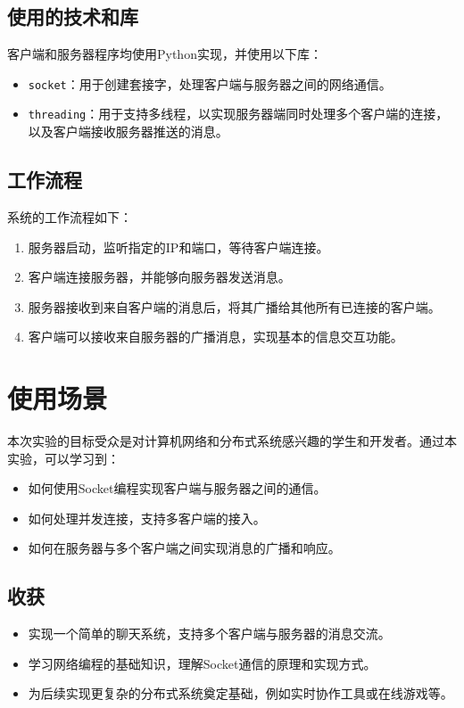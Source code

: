 \documentclass[12pt]{article}
\begin{document}
\subsection{使用的技术和库}
客户端和服务器程序均使用Python实现，并使用以下库：
\begin{itemize}
    \item \texttt{socket}：用于创建套接字，处理客户端与服务器之间的网络通信。
    \item \texttt{threading}：用于支持多线程，以实现服务器端同时处理多个客户端的连接，以及客户端接收服务器推送的消息。
\end{itemize}

\subsection{工作流程}
系统的工作流程如下：
\begin{enumerate}
    \item 服务器启动，监听指定的IP和端口，等待客户端连接。
    \item 客户端连接服务器，并能够向服务器发送消息。
    \item 服务器接收到来自客户端的消息后，将其广播给其他所有已连接的客户端。
    \item 客户端可以接收来自服务器的广播消息，实现基本的信息交互功能。
\end{enumerate}

\section{使用场景}
本次实验的目标受众是对计算机网络和分布式系统感兴趣的学生和开发者。通过本实验，可以学习到：
\begin{itemize}
    \item 如何使用Socket编程实现客户端与服务器之间的通信。
    \item 如何处理并发连接，支持多客户端的接入。
    \item 如何在服务器与多个客户端之间实现消息的广播和响应。
\end{itemize}

\subsection{收获}
\begin{itemize}
    \item 实现一个简单的聊天系统，支持多个客户端与服务器的消息交流。
    \item 学习网络编程的基础知识，理解Socket通信的原理和实现方式。
    \item 为后续实现更复杂的分布式系统奠定基础，例如实时协作工具或在线游戏等。
\end{itemize}
\end{document}
